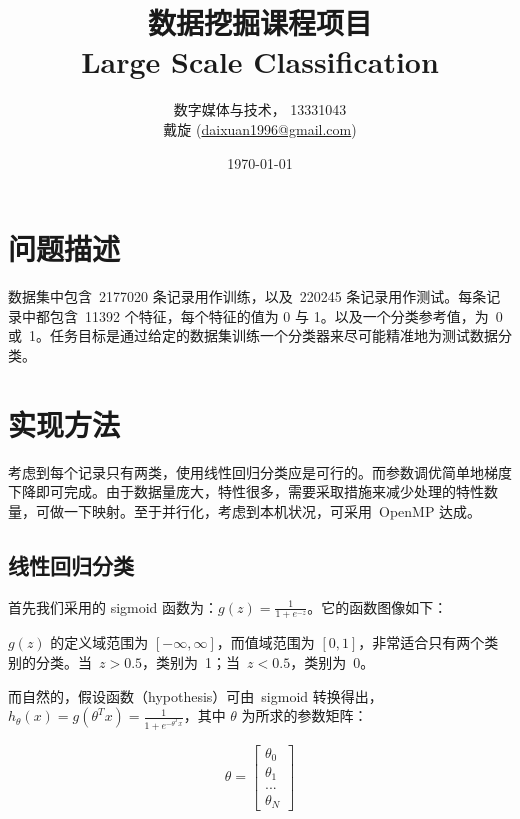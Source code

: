 \documentclass[hyperref, UTF8]{ctexart}
\title{数据挖掘课程项目 \\
	Large Scale Classification}
\author{
	数字媒体与技术， 13331043 \\
	戴旋  (\href{mailto:daixuan1996@gmail.com}{daixuan1996@gmail.com})}
\date{\today}
\begin{document}
\maketitle
\tableofcontents

\section{问题描述}

数据集中包含\ 2177020 条记录用作训练，以及\ 220245 条记录用作测试。每条记录中都包含\ 11392 个特征，每个特征的值为 0 与 1。以及一个分类参考值，为\ 0 或\ 1。任务目标是通过给定的数据集训练一个分类器来尽可能精准地为测试数据分类。

\section{实现方法}

考虑到每个记录只有两类，使用线性回归分类应是可行的。而参数调优简单地梯度下降即可完成。由于数据量庞大，特性很多，需要采取措施来减少处理的特性数量，可做一下映射。至于并行化，考虑到本机状况，可采用\ OpenMP 达成。

\subsection{线性回归分类}

首先我们采用的 sigmoid 函数为：$g(z) = \frac{1}{1 + e^{-z}}$。它的函数图像如下：

\begin{center}
\end{center}

$g(z)$ 的定义域范围为 $[-\infty, \infty]$，而值域范围为 $[0, 1]$，非常适合只有两个类别的分类。当\ $z > 0.5$，类别为\ 1；当\ $z < 0.5$，类别为\ 0。

而自然的，假设函数（hypothesis）可由\ sigmoid 转换得出，$h_{\theta}(x) = g(\theta^{T}x) = \frac{1}{1 + e^{-\theta^Tx}}$，其中 $\theta$ 为所求的参数矩阵：

$$ \theta = \left[{\begin{array}{c} \theta_0 \\ \theta_1 \\ ... \\ \theta_N \end{array}} \right] $$
\end{document}
